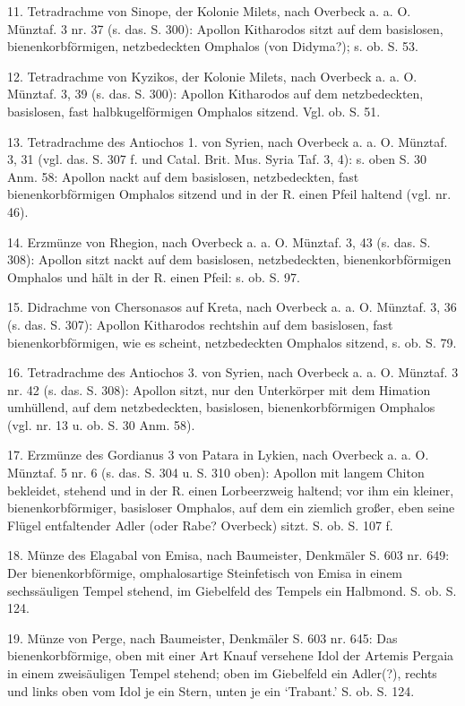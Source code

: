 \documentclass[a4paper, 11pt, oneside]{article}
\begin{document}
11. Tetradrachme von Sinope, der Kolonie Milets, nach Overbeck a. a. O. Münztaf. 3 nr. 37 (s. das. S. 300): Apollon Kitharodos sitzt auf dem basislosen, bienenkorbförmigen, netzbedeckten Omphalos (von Didyma?); s. ob. S. 53.

12. Tetradrachme von Kyzikos, der Kolonie Milets, nach Overbeck a. a. O. Münztaf. 3, 39 (s. das. S. 300): Apollon Kitharodos auf dem netzbedeckten, basislosen, fast halbkugelförmigen Omphalos sitzend. Vgl. ob. S. 51.

13. Tetradrachme des Antiochos 1. von Syrien, nach Overbeck a. a. O. Münztaf. 3, 31 (vgl. das. S. 307 f. und Catal. Brit. Mus. Syria Taf. 3, 4): s. oben S. 30 Anm. 58: Apollon nackt auf dem basislosen, netzbedeckten, fast bienenkorbförmigen Omphalos sitzend und in der R. einen Pfeil haltend (vgl. nr. 46).

14. Erzmünze von Rhegion, nach Overbeck a. a. O. Münztaf. 3, 43 (s. das. S. 308): Apollon sitzt nackt auf dem basislosen, netzbedeckten, bienenkorbförmigen Omphalos und hält in der R. einen Pfeil: s. ob. S. 97.

15. Didrachme von Chersonasos auf Kreta, nach Overbeck a. a. O. Münztaf. 3, 36 (s. das. S. 307): Apollon Kitharodos rechtshin auf dem basislosen, fast bienenkorbförmigen, wie es scheint, netzbedeckten Omphalos sitzend, s. ob. S. 79.

16. Tetradrachme des Antiochos 3. von Syrien, nach Overbeck a. a. O. Münztaf. 3 nr. 42 (s. das. S. 308): Apollon sitzt, nur den Unterkörper mit dem Himation umhüllend, auf dem netzbedeckten, basislosen, bienenkorbförmigen Omphalos (vgl. nr. 13 u. ob. S. 30 Anm. 58).

17. Erzmünze des Gordianus 3 von Patara in Lykien, nach Overbeck a. a. O. Münztaf. 5 nr. 6 (s. das. S. 304 u. S. 310 oben): Apollon mit langem Chiton bekleidet, stehend und in der R. einen Lorbeerzweig haltend; vor ihm ein kleiner, bienenkorbförmiger, basisloser Omphalos, auf dem ein ziemlich großer, eben seine Flügel entfaltender Adler (oder Rabe? Overbeck) sitzt. S. ob. S. 107 f.

18. Münze des Elagabal von Emisa, nach Baumeister, Denkmäler S. 603 nr. 649: Der bienenkorbförmige, omphalosartige Steinfetisch von Emisa in einem sechssäuligen Tempel stehend, im Giebelfeld des Tempels ein Halbmond. S. ob. S. 124.

19. Münze von Perge, nach Baumeister, Denkmäler S. 603 nr. 645: Das bienenkorbförmige, oben mit einer Art Knauf versehene Idol der Artemis Pergaia in einem zweisäuligen Tempel stehend; oben im Giebelfeld ein Adler(?), rechts und links oben vom Idol je ein Stern, unten je ein `Trabant.' S. ob. S. 124.
\end{document}
